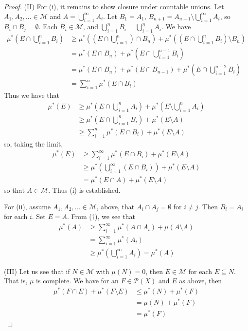 \documentclass[11pt, a4paper]{memoir}
\theoremstyle{change}
\theoremstyle{plain}
\theoremstyle{nonumberplain}
\newtheorem{proof}{Proof}
\begin{document}
\begin{proof}
    (II) For (i), it remains to show closure under countable unions.
    Let $A_1,A_2,\ldots\in\mathcal{M}$ and $A=\bigcup_{i=1}^\infty A_i$.
    Let $B_1=A_1$, $B_{n+1}=A_{n+1}\setminus\bigcup_{i=1}^\infty A_i$, so $B_i\cap B_j=\emptyset$.
    Each $B_i\in\mathcal{M}$, and $\bigcup_{i=1}^n B_i=\bigcup_{i=1}^n A_i$.
    We have
    \begin{align*}
        \mu^*(E\cap\bigcup_{i=1}^n B_i) &\geq\mu^*\left((E\cap\bigcup_{i=1}^n)\cap B_n\right)+\mu^*\left((E\cap\bigcup_{i=1}^n B_i)\setminus B_n\right)\\
                                        &= \mu^*(E\cap B_n)+\mu^*\left(E\cap\bigcup_{i=1}^{n-1}B_i\right)\\
                                        &= \mu^*(E\cap B_n)+\mu^*(E\cap B_{n-1})+\mu^*\left(E\cap\bigcup_{i=1}^{n-2}B_i\right)\\
                                        &= \sum\limits_{i=1}^n \mu^*(E\cap B_i)
    \end{align*}
    Thus we have that
    \begin{align*}
        \mu^*(E) &\geq\mu^*\left(E\cap\bigcup_{i=1}^n A_i\right)+\mu^*\left(E\setminus\bigcup_{i=1}^n A_i\right)\\
                 &\geq\mu^*\left(E\cap\bigcup_{i=1}^n B_i\right)+\mu^*(E\setminus A)\\
                 &\geq\sum\limits_{i=1}^n\mu^*(E\cap B_i)+\mu^*(E\setminus A)
    \end{align*}
    so, taking the limit,
    \begin{align*}
        \mu^*(E) &\geq\sum\limits_{i=1}^\infty\mu^*(E\cap B_i)+\mu^*(E\setminus A)\\
                 &\geq\mu^*\left(\bigcup_{i=1}^\infty(E\cap B_i)\right)+\mu^*(E\setminus A)\tag{$\dagger$}\\
                 &=\mu^*(E\cap A)+\mu^*(E\setminus A)
    \end{align*}
    so that $A\in\mathcal{M}$.
    Thus (i) is established.

    For (ii), assume $A_1,A_2,\ldots\in\mathcal{M}$, above, that $A_i\cap A_j=\emptyset$ for $i\neq j$.
    Then $B_i=A_i$ for each $i$.
    Set $E=A$.
    From ($\dagger$), we see that
    \begin{align*}
        \mu^*(A) &\geq \sum\limits_{i=1}^\infty \mu^*(A\cap A_i)+\mu(A\setminus A)\\
                 &= \sum\limits_{i=1}^\infty \mu^*(A_i)\\
                 &\geq \mu^*(\bigcup_{i=1}^\infty A_i)=\mu^*(A)
    \end{align*}

    (III) Let us see that if $N\in\mathcal{M}$ with $\mu(N)=0$, then $E\in\mathcal{M}$ for each $E\subseteq N$.
    That is, $\mu$ is complete.
    We have for an $F\in\mathcal{P}(X)$ and $E$ as above, then
    \begin{align*}
        \mu^*(F\cap E)+\mu^*(F\setminus E) &\leq \mu^*(N)+\mu^*(F)\\
                                           &= \mu(N)+\mu^*(F)\\
                                           &= \mu^*(F)
    \end{align*}
\end{proof}
\end{document}

